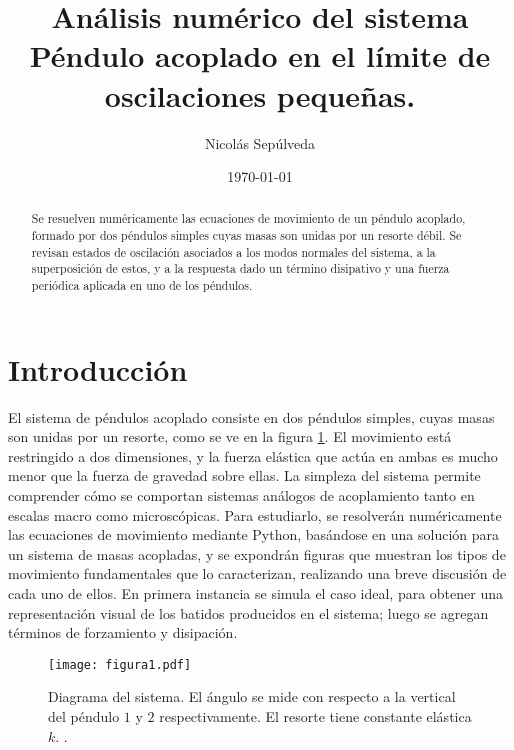 \documentclass[%
 aip,
rsi,%
 amsmath,amssymb,
 reprint,%
]{revtex4-1}
\begin{document}

\title{An\'alisis num\'erico del sistema P\'endulo acoplado en el l\'imite de oscilaciones peque\~nas.}%

\author{Nicol\'as Sep\'ulveda}



\date{\today}%

\begin{abstract}
Se resuelven num\'ericamente las ecuaciones de movimiento de un p\'endulo acoplado, formado por dos p\'endulos simples cuyas masas son unidas por un resorte d\'ebil. Se revisan estados de oscilaci\'on asociados a los modos normales del sistema, a la superposici\'on de estos, y a la respuesta dado un t\'ermino disipativo y una fuerza peri\'odica aplicada en uno de los p\'endulos.

\end{abstract}

\maketitle












\section{Introducci\'on}



El sistema de p\'endulos acoplado consiste en dos p\'endulos simples, cuyas masas son unidas por un resorte, como se ve en la figura \ref{esquema}. El movimiento est\'a restringido a dos dimensiones, y la fuerza el\'astica que act\'ua en ambas es mucho menor que la fuerza de gravedad sobre ellas. La simpleza del sistema permite comprender c\'omo se comportan sistemas an\'alogos de acoplamiento tanto en escalas macro como microsc\'opicas. Para estudiarlo, se resolver\'an num\'ericamente las ecuaciones de movimiento mediante Python, bas\'andose en una soluci\'on para un sistema de masas acopladas\cite{sist_acoplado}, y se expondr\'an figuras que muestran los tipos de movimiento fundamentales que lo caracterizan, realizando una breve discusi\'on de cada uno de ellos. En primera instancia se simula el caso ideal, para obtener una representaci\'on visual de los batidos producidos en el sistema; luego se agregan t\'erminos de forzamiento y disipaci\'on.
\begin{figure}
    \centering
    {\texttt{[image: figura1.pdf]}
    \caption{\label{esquema} Diagrama del sistema. El \'angulo se mide con respecto a la vertical del p\'endulo $1$ y $2$ respectivamente. El resorte tiene constante el\'astica $k$. .}}
\end{figure}
\end{document}

